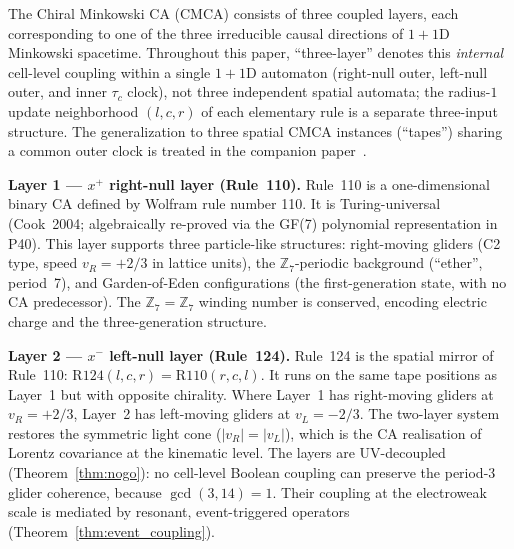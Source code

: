 \documentclass[11pt]{article}
\theoremstyle{remark}
\newcommand{\ZS}{\mathbb{Z}_7}
\begin{document}
\begin{tcolorbox}[colback=blue!3,colframe=blue!40!black,
  title={\textbf{How the Chiral Minkowski CA works: a layer-by-layer overview}},
  fonttitle=\bfseries,left=8pt,right=8pt,top=6pt,bottom=6pt]
\small
The Chiral Minkowski CA (CMCA) consists of three coupled layers, each
corresponding to one of the three irreducible causal directions of $1+1$D
Minkowski spacetime.
Throughout this paper, ``three-layer'' denotes this \emph{internal}
cell-level coupling within a single $1+1$D automaton (right-null outer,
left-null outer, and inner $\tau_c$ clock), not three independent spatial
automata; the radius-$1$ update neighborhood $(l,c,r)$ of each elementary
rule is a separate three-input structure.
The generalization to three spatial CMCA instances (``tapes'') sharing a
common outer clock is treated in the companion
paper~\cite{SpivackThreeTapeCMCA}.

\medskip
\textbf{Layer 1 — $x^+$ right-null layer (Rule~110).}
Rule~110 is a one-dimensional binary CA defined by Wolfram rule number 110.
It is Turing-universal (Cook~2004; algebraically re-proved via the GF(7)
polynomial representation in P40).
This layer supports three particle-like structures: right-moving gliders
(C2 type, speed $v_R = +2/3$ in lattice units), the $\ZS$-periodic background
(``ether'', period~7), and Garden-of-Eden configurations (the first-generation
state, with no CA predecessor).  The $\ZS = \mathbb{Z}_7$ winding number is
conserved, encoding electric charge and the three-generation structure.

\medskip
\textbf{Layer 2 — $x^-$ left-null layer (Rule~124).}
Rule~124 is the spatial mirror of Rule~110: $\mathrm{R124}(l,c,r) =
\mathrm{R110}(r,c,l)$.  It runs on the same tape positions as Layer~1 but
with opposite chirality.  Where Layer~1 has right-moving gliders at $v_R =
+2/3$, Layer~2 has left-moving gliders at $v_L = -2/3$.  The two-layer system
restores the symmetric light cone ($|v_R| = |v_L|$), which is the CA
realisation of Lorentz covariance at the kinematic level.
The layers are UV-decoupled (Theorem~\ref{thm:nogo}): no cell-level Boolean
coupling can preserve the period-3 glider coherence, because $\gcd(3, 14) = 1$.
Their coupling at the electroweak scale is mediated by resonant, event-triggered
operators (Theorem~\ref{thm:event_coupling}).


\end{tcolorbox}
\end{document}
